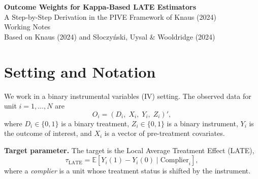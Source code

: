 \documentclass[12pt, a4paper]{article}
\theoremstyle{condstyle}
\theoremstyle{plain}
\newcommand{\that}[1]{\hat{\tau}_{#1}}
\begin{document}
\begin{titlepage}
\centering
\vspace*{2cm}
{\LARGE\bfseries Outcome Weights for Kappa-Based LATE Estimators}\\[0.5em]
{\large A Step-by-Step Derivation in the PIVE Framework of Knaus (2024)}\\[2cm]

{\large Working Notes}\\[0.5em]
{\normalsize Based on Knaus (2024) and Słoczy\'nski, Uysal \& Wooldridge (2024)}\\[3cm]

\begin{abstract}
\noindent
These notes derive the outcome weights $\omega_i$ such that $\hat\tau = \sum_i \omega_i Y_i$
for three kappa-based estimators of the Local Average Treatment Effect (LATE):
the fully-normalized estimator $\that{a,10}$, the unnormalized Abadie estimator $\that{a}$,
and the Uysal normalized estimator $\that{u}$.
The derivation follows the Pseudo-IV Estimator (PIVE) framework of Knaus (2024).
For each estimator we state which conditions from Knaus (2024) are needed,
explain what those conditions mean in the kappa context,
and show step by step whether the outcome weights are
fully-normalized ($\sum_i \omega_i D_i = 1$, $\sum_i \omega_i (1-D_i) = -1$),
scale-normalized, or unnormalized.
\end{abstract}
\vfill
\end{titlepage}

\tableofcontents
\newpage

\section{Setting and Notation}
\label{sec:setup}

We work in a binary instrumental variables (IV) setting.
The observed data for unit $i = 1, \ldots, N$ are
\[
  O_i = (D_i,\; X_i,\; Y_i,\; Z_i)',
\]
where $D_i \in \{0,1\}$ is a binary treatment, $Z_i \in \{0,1\}$ is a binary instrument,
$Y_i$ is the outcome of interest, and $X_i$ is a vector of pre-treatment covariates.

\medskip
\noindent\textbf{Target parameter.}
The target is the Local Average Treatment Effect (LATE),
\[
  \tau_{\mathrm{LATE}} = \mathbb{E}[Y_i(1) - Y_i(0) \mid \text{Complier}_i],
\]
where a \emph{complier} is a unit whose treatment status is shifted by the instrument.
\end{document}
